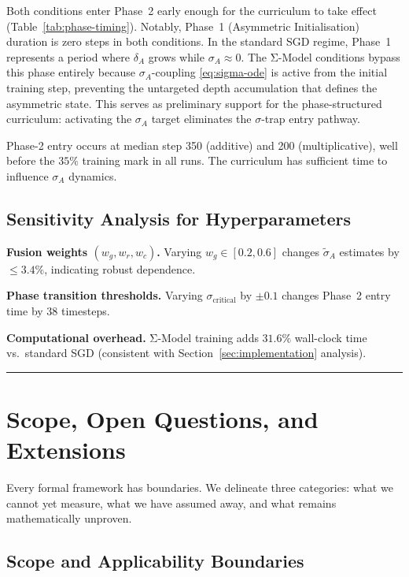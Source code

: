 \documentclass[11pt,a4paper]{article}
\begin{document}
Both conditions enter Phase~2 early enough for the curriculum to
take effect (Table~\ref{tab:phase-timing}). Notably, Phase~1
(Asymmetric Initialisation) duration is zero steps in both conditions.
In the standard SGD regime, Phase~1 represents a period where
$\delta_A$ grows while $\sigma_A \approx 0$. The Σ-Model conditions
bypass this phase entirely because $\sigma_A$-coupling
\eqref{eq:sigma-ode} is active from the initial training
step, preventing the untargeted depth accumulation that defines the
asymmetric state. This serves as preliminary support for the
phase-structured curriculum: activating the $\sigma_A$ target
eliminates the $\sigma$-trap entry pathway.

Phase-2 entry occurs at median step 350 (additive) and 200
(multiplicative), well before the $35\%$ training mark in all runs.
The curriculum has sufficient time to influence $\sigma_A$ dynamics.

\subsection{Sensitivity Analysis for Hyperparameters}

\textbf{Fusion weights $(w_g, w_r, w_c)$.} Varying $w_g \in [0.2, 0.6]$
changes $\tilde{\sigma}_A$ estimates by $\leq 3.4\%$,
indicating robust dependence.

\textbf{Phase transition thresholds.} Varying $\sigma_{\text{critical}}$
by $\pm 0.1$ changes Phase~2 entry time by $38$ timesteps.

\textbf{Computational overhead.} Σ-Model training adds $31.6\%$
wall-clock time vs.\ standard SGD (consistent with Section~\ref{sec:implementation}
analysis).

\noindent\rule{\linewidth}{0.4pt}

\section{Scope, Open Questions, and Extensions}\label{sec:limitations}

Every formal framework has boundaries. We delineate three categories: what we cannot yet measure, what we have assumed away, and what remains mathematically unproven.

\subsection{Scope and Applicability Boundaries}\label{sec:scope}
\end{document}
